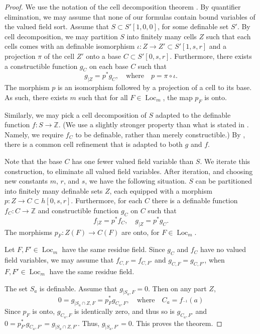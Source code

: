 \documentclass[12pt]{amsart}
\newcommand{\op}[1]{\operatorname{#1}}
\newcommand{\ring}[1]{{\mathbb #1}}
\theoremstyle{plain}
\theoremstyle{definition}
\begin{document}
\begin{proof} We use the notation of the cell decomposition theorem
  \cite[Theorem 7.2.1]{CL}.  By quantifier elimination, we may assume
  that none of our formulas contain bound variables of the valued
  field sort.  Assume that $S\subset S'[1,0,0]$, for some definable set
  $S'$.  By cell decomposition, we may partition $S$ into finitely many
  cells $Z$ such that each cells comes with an definable isomorphism
  $\iota:Z \to Z'\subset S'[1,s,r]$ and a projection $\pi$ of the
  cell $Z'$ onto a base $C\subset S'[0,s,r]$.  Furthermore, there exists
  a constructible function $g_C$ on each base $C$ such that
\[
g_{|Z} = p^* g_C, \quad\text{where}\quad p = \pi\circ\iota.
\]
The morphism $p$ is an isomorphism followed by a
projection of a cell to its base.  As such, there exists $m$ such that
for all $F\in \op{Loc}_m$, the map $p_F$ is onto.

Similarly, we may pick a cell decomposition of $S$ adapted to the
definable function $f:S\to \ring{Z}$.  (We use a slightly stronger
property than what is stated in \cite{CL}.  Namely, we require $f_C$ to
be definable, rather than merely constructible.)  By \cite[Prop
7.3.2]{CL}, there is a common cell refinement that is adapted to both
$g$ and $f$.

Note that the base $C$ has one fewer valued field variable than $S$.
We iterate this construction, to eliminate all valued field variables.
After iteration, and choosing new constants $m$, $r$, and $s$, we
have the following situation.  $S$ can be partitioned into finitely
many definable sets $Z$, each equipped with a morphism $p:Z\to
C\subset h[0,s,r]$.  Furthermore, for each $C$ there is a definable
function $f_C:C\to\ring{Z}$ and constructible function $g_C$ on $C$
such that
\[
f_{|Z} = p^* f_C,\quad  g_{|Z} = p^* g_C.
\]
The morphisms $p_F:Z(F)\to C(F)$ are onto, for $F\in\op{Loc}_m$.

Let $F,F'\in\op{Loc}_m$ have the same residue field.  Since $g_C$ and
$f_C$ have no valued field variables, we may assume that $f_{C,F} =
f_{C,F'}$ and $g_{C,F} = g_{C,F'}$, when $F,F'\in\op{Loc}_m$ have the
same residue field.

The set $S_a$ is definable.  Assume that $g_{|S_a,F} = 0$.  Then on
any part $Z$,
\[
0 = g_{|S_a\cap Z,F} = p^*_F g_{C_a,F}, \quad\text{where}\quad C_a = f_^{-1}(a)
\]
Since $p_F$ is onto, $g_{C_a,F}$ is identically zero, and thus so is
$g_{C_a,F'}$ and $0 = p^*_{F'} g_{C_a,F'} = g_{|S_a\cap Z,F'}$.  Thus,
$g_{|S_a,F'}=0$.  This proves the theorem.
\end{proof}
\end{document}
